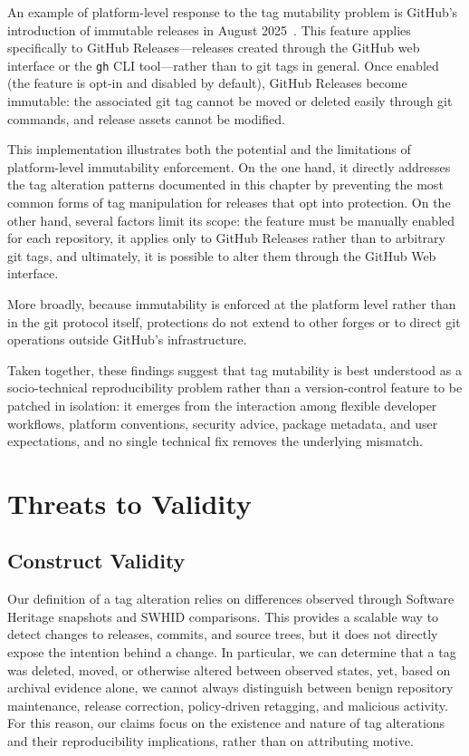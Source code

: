 An example of platform-level response to the tag mutability problem is GitHub's introduction of immutable releases in August 2025~\cite{github_immutable_releases}.
This feature applies specifically to GitHub Releases---releases created through the GitHub web interface or the \texttt{gh} CLI tool---rather than to git tags in general.
Once enabled (the feature is opt-in and disabled by default), GitHub Releases become immutable: the associated git tag cannot be moved or deleted easily through git commands, and release assets cannot be modified.

This implementation illustrates both the potential and the limitations of platform-level immutability enforcement.
On the one hand, it directly addresses the tag alteration patterns documented in this chapter by preventing the most common forms of tag manipulation for releases that opt into protection.
On the other hand, several factors limit its scope: the feature must be manually enabled for each repository, it applies only to GitHub Releases rather than to arbitrary git tags, and ultimately, it is possible to alter them through the GitHub Web interface.

More broadly, because immutability is enforced at the platform level rather than in the git protocol itself, protections do not extend to other forges or to direct git operations outside GitHub's infrastructure.

Taken together, these findings suggest that tag mutability is best understood as a socio-technical reproducibility problem rather than a version-control feature to be patched in isolation: it emerges from the interaction among flexible developer workflows, platform conventions, security advice, package metadata, and user expectations, and no single technical fix removes the underlying mismatch.

\section{Threats to Validity}
\label{sec:tags-validity}

\subsection{Construct Validity}
\label{subsec:tags-val-construct}

Our definition of a tag alteration relies on differences observed through Software Heritage snapshots and SWHID comparisons.
This provides a scalable way to detect changes to releases, commits, and source trees, but it does not directly expose the intention behind a change.
In particular, we can determine that a tag was deleted, moved, or otherwise altered between observed states, yet, based on archival evidence alone, we cannot always distinguish between benign repository maintenance, release correction, policy-driven retagging, and malicious activity.
For this reason, our claims focus on the existence and nature of tag alterations and their reproducibility implications, rather than on attributing motive.

